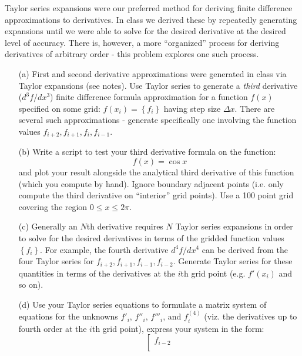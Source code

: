 \documentclass{article}
\begin{document}
\begin{enumerate}
Taylor series expansions were our preferred method for deriving finite difference approximations to derivatives.  In class we derived these by repeatedly generating expansions until we were able to solve for the desired derivative at the desired level of accuracy.  There is, however, a more ``organized'' process for deriving derivatives of arbitrary order - this problem explores one such process.  
  \begin{enumerate}
     \item[(a)]  First and second derivative approximations were generated in class via Taylor expansions (see notes).  Use Taylor series to generate a \emph{third} derivative ($d^3 f / dx^3$) finite difference formula approximation for a function $f(x)$ specified on some grid:  $f(x_i) = \left\{ f_i \right\} $ having step size $\Delta x$.  There are several such approximations - generate specifically one involving the function values $f_{i+2},f_{i+1},f_i,f_{i-1}$.  %
     \item[(b)]  Write a script to test your third derivative formula on the function:
     \begin{equation}
       f(x) = \cos x \label{eqn:testfn}
     \end{equation}
     and plot your result alongside the analytical third derivative of this function (which you compute by hand).  Ignore boundary adjacent points (i.e. only compute the third derivative on ``interior'' grid points).  Use a 100 point grid covering the region $0 \le x \le 2 \pi$.
     \item[(c)]  Generally an $N$th derivative requires $N$ Taylor series expansions in order to solve for the desired derivatives in terms of the gridded function values $\left\{ f_i \right\}$.  For example, the fourth derivative $d^4 f / dx^4$ can be derived from the four Taylor series for $f_{i+2},f_{i+1},f_{i-1},f_{i-2}$.  Generate Taylor series for these quantities in terms of the derivatives at the $i$th grid point (e.g. $f'(x_i)$ and so on). 
     \item[(d)] Use your Taylor series equations to formulate a matrix system of equations for the unknowns $f'_i$, $f''_i$, $f'''_i$, and $f^{(4)}_i$ (viz. the derivatives up to fourth order at the $i$th grid point), express your system in the form:
     \begin{equation}
       \left[
       \begin{array}{c}
         f_{i-2} \\

\end{array}
\end{equation}
\end{enumerate}
\end{enumerate}
\end{document}
